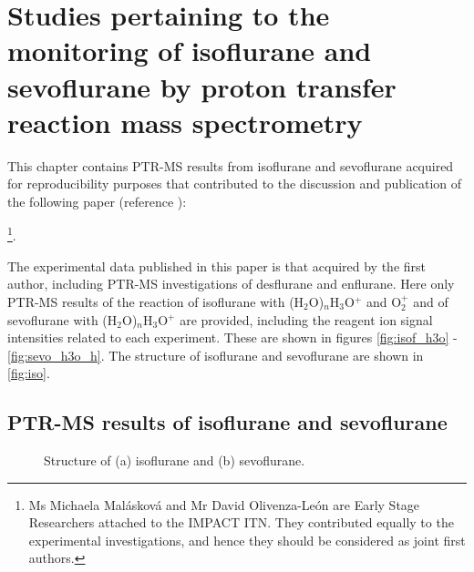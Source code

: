 

\chapter{Studies pertaining to the monitoring of isoflurane and sevoflurane by proton transfer reaction mass spectrometry}\label{chapter:iso}


This chapter contains PTR-MS results from isoflurane and sevoflurane acquired for reproducibility purposes that contributed to the discussion and publication of the following paper (reference \cite{ISOF_paper}):

\footnote{Ms Michaela Malásková and Mr David Olivenza-León are Early Stage Researchers attached to the IMPACT ITN. They contributed equally to the experimental investigations, and hence they should be considered as joint first authors.}.


The experimental data published in this paper is that acquired by the first author, including PTR-MS investigations of desflurane and enflurane.
%
Here only PTR-MS results of the reaction 
of isoflurane with (H$_2$O)$_n$H$_3$O$^+$ and O$_2^+$ 
and of sevoflurane with (H$_2$O)$_n$H$_3$O$^+$ 
are provided, including the reagent ion signal intensities related to each experiment.
%
These are shown in figures \ref{fig:isof_h3o} - \ref{fig:sevo_h3o_h}.
%
%
%
%
The structure of isoflurane and sevoflurane are shown in \autoref{fig:iso}.



\section{PTR-MS results of isoflurane and sevoflurane}


\begin{figure}
  \caption{Structure of (a) isoflurane and (b) sevoflurane.}
  \label{fig:iso}
\end{figure}




